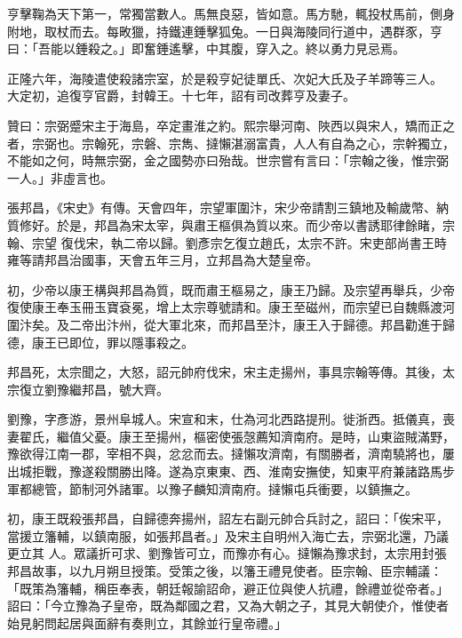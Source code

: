\begin{pinyinscope}
 亨擊鞠為天下第一，常獨當數人。馬無良惡，皆如意。馬方馳，輒投杖馬前，側身附地，取杖而去。每畋獵，持鐵連錘擊狐兔。一日與海陵同行道中，遇群豕，亨曰：「吾能以錘殺之。」即奮錘遙擊，中其腹，穿入之。終以勇力見忌焉。



 正隆六年，海陵遣使殺諸宗室，於是殺亨妃徒單氏、次妃大氏及子羊蹄等三人。
 大定初，追復亨官爵，封韓王。十七年，詔有司改葬亨及妻子。



 贊曰：宗弼蹙宋主于海島，卒定畫淮之約。熙宗舉河南、陜西以與宋人，矯而正之者，宗弼也。宗翰死，宗磐、宗雋、撻懶湛溺富貴，人人有自為之心，宗幹獨立，不能如之何，時無宗弼，金之國勢亦曰殆哉。世宗嘗有言曰：「宗翰之後，惟宗弼一人。」非虛言也。



 張邦昌，《宋史》有傳。天會四年，宗望軍圍汴，宋少帝請割三鎮地及輸歲幣、納質修好。於是，邦昌為宋太宰，與肅王樞俱為質以來。而少帝以書誘耶律餘睹，宗翰、宗望
 復伐宋，執二帝以歸。劉彥宗乞復立趙氏，太宗不許。宋吏部尚書王時雍等請邦昌治國事，天會五年三月，立邦昌為大楚皇帝。



 初，少帝以康王構與邦昌為質，既而肅王樞易之，康王乃歸。及宗望再舉兵，少帝復使康王奉玉冊玉寶袞冕，增上太宗尊號請和。康王至磁州，而宗望已自魏縣渡河圍汴矣。及二帝出汴州，從大軍北來，而邦昌至汴，康王入于歸德。邦昌勸進于歸德，康王已即位，罪以隱事殺之。



 邦昌死，太宗聞之，大怒，詔元帥府伐宋，宋主走揚州，事具宗翰等傳。其後，太宗復立劉豫繼邦昌，號大齊。



 劉豫，字彥游，景州阜城人。宋宣和末，仕為河北西路提刑。徙浙西。抵儀真，喪妻翟氏，繼值父憂。康王至揚州，樞密使張愨薦知濟南府。是時，山東盜賊滿野，豫欲得江南一郡，宰相不與，忿忿而去。撻懶攻濟南，有關勝者，濟南驍將也，屢出城拒戰，豫遂殺關勝出降。遂為京東東、西、淮南安撫使，知東平府兼諸路馬步軍都總管，節制河外諸軍。以豫子麟知濟南府。撻懶屯兵衝要，以鎮撫之。



 初，康王既殺張邦昌，自歸德奔揚州，詔左右副元帥合兵討之，詔曰：「俟宋平，當援立籓輔，以鎮南服，如張邦昌者。」及宋主自明州入海亡去，宗弼北還，乃議更立其
 人。眾議折可求、劉豫皆可立，而豫亦有心。撻懶為豫求封，太宗用封張邦昌故事，以九月朔旦授策。受策之後，以籓王禮見使者。臣宗翰、臣宗輔議：「既策為籓輔，稱臣奉表，朝廷報諭詔命，避正位與使人抗禮，餘禮並從帝者。」詔曰：「今立豫為子皇帝，既為鄰國之君，又為大朝之子，其見大朝使介，惟使者始見躬問起居與面辭有奏則立，其餘並行皇帝禮。」




\end{pinyinscope}
